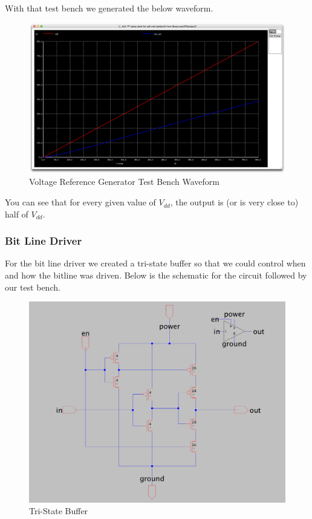 \documentclass[a4paper]{article}
\begin{document}
With that test bench we generated the below waveform.\\

\begin{figure}[H]
	\centering
	\includegraphics[scale=0.1]{vRefTestWave}
	\caption{Voltage Reference Generator Test Bench Waveform}
	\label{fig:vRefTestWave}
\end{figure}

You can see that for every given value of $V_{dd}$, the output is (or is very close to) half of $V_{dd}$.

\subsubsection{Bit Line Driver}

For the bit line driver we created a tri-state buffer so that we could control when and how the bitline was driven. Below is the schematic for the circuit followed by our test bench.

\begin{figure}[H]
	\centering
	\includegraphics[scale=0.15]{tristate}
	\caption{Tri-State Buffer}
	\label{fig:tristate}
\end{figure}
\end{document}
